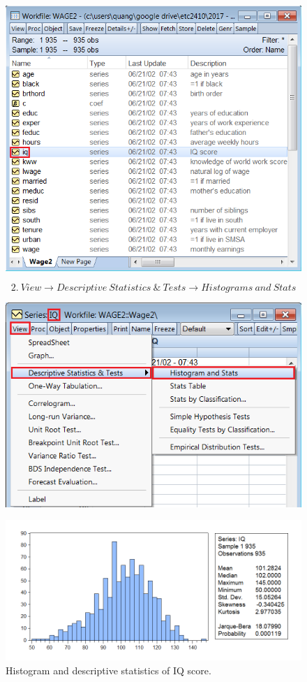 \documentclass[12pt]{report}
\begin{document}
\begin{figure}[H]
	\centering
	\includegraphics{q3_4}
\end{figure}
\vspace{-\baselineskip}
$$2.\ View \to Descriptive\ Statistics\ \&\ Tests \to Histograms\ and\ Stats$$
\begin{figure}[H]
	\centering
	\includegraphics{q3_5}
\end{figure}
\vspace{-\baselineskip}
\begin{figure}[H]
	\centerline{\includegraphics{q3_6}}
	\caption{Histogram and descriptive statistics of IQ score.}
	\label{fig:hist2}
\end{figure}
\end{document}
